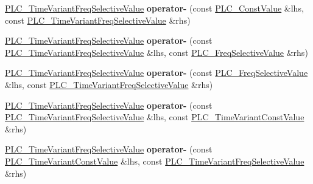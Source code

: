 \begin{DoxyCompactItemize}
\item 
\hypertarget{classns3_1_1PLC__TimeVariantFreqSelectiveValue_adf586392cef7de90730546a6350120cf}{\hyperlink{classns3_1_1PLC__TimeVariantFreqSelectiveValue}{\-P\-L\-C\-\_\-\-Time\-Variant\-Freq\-Selective\-Value} {\bfseries operator-\/} (const \hyperlink{classns3_1_1PLC__ConstValue}{\-P\-L\-C\-\_\-\-Const\-Value} \&lhs, const \hyperlink{classns3_1_1PLC__TimeVariantFreqSelectiveValue}{\-P\-L\-C\-\_\-\-Time\-Variant\-Freq\-Selective\-Value} \&rhs)}\label{classns3_1_1PLC__TimeVariantFreqSelectiveValue_adf586392cef7de90730546a6350120cf}

\item 
\hypertarget{classns3_1_1PLC__TimeVariantFreqSelectiveValue_a29c786d584a873331a8f7685f959a12f}{\hyperlink{classns3_1_1PLC__TimeVariantFreqSelectiveValue}{\-P\-L\-C\-\_\-\-Time\-Variant\-Freq\-Selective\-Value} {\bfseries operator-\/} (const \hyperlink{classns3_1_1PLC__TimeVariantFreqSelectiveValue}{\-P\-L\-C\-\_\-\-Time\-Variant\-Freq\-Selective\-Value} \&lhs, const \hyperlink{classns3_1_1PLC__FreqSelectiveValue}{\-P\-L\-C\-\_\-\-Freq\-Selective\-Value} \&rhs)}\label{classns3_1_1PLC__TimeVariantFreqSelectiveValue_a29c786d584a873331a8f7685f959a12f}

\item 
\hypertarget{classns3_1_1PLC__TimeVariantFreqSelectiveValue_a8413e331689c49e697e8ce8ba6bb1b66}{\hyperlink{classns3_1_1PLC__TimeVariantFreqSelectiveValue}{\-P\-L\-C\-\_\-\-Time\-Variant\-Freq\-Selective\-Value} {\bfseries operator-\/} (const \hyperlink{classns3_1_1PLC__FreqSelectiveValue}{\-P\-L\-C\-\_\-\-Freq\-Selective\-Value} \&lhs, const \hyperlink{classns3_1_1PLC__TimeVariantFreqSelectiveValue}{\-P\-L\-C\-\_\-\-Time\-Variant\-Freq\-Selective\-Value} \&rhs)}\label{classns3_1_1PLC__TimeVariantFreqSelectiveValue_a8413e331689c49e697e8ce8ba6bb1b66}

\item 
\hypertarget{classns3_1_1PLC__TimeVariantFreqSelectiveValue_a1ef0bfbaf48fc181eb32cfa80f338b5d}{\hyperlink{classns3_1_1PLC__TimeVariantFreqSelectiveValue}{\-P\-L\-C\-\_\-\-Time\-Variant\-Freq\-Selective\-Value} {\bfseries operator-\/} (const \hyperlink{classns3_1_1PLC__TimeVariantFreqSelectiveValue}{\-P\-L\-C\-\_\-\-Time\-Variant\-Freq\-Selective\-Value} \&lhs, const \hyperlink{classns3_1_1PLC__TimeVariantConstValue}{\-P\-L\-C\-\_\-\-Time\-Variant\-Const\-Value} \&rhs)}\label{classns3_1_1PLC__TimeVariantFreqSelectiveValue_a1ef0bfbaf48fc181eb32cfa80f338b5d}

\item 
\hypertarget{classns3_1_1PLC__TimeVariantFreqSelectiveValue_a25b88e7645b32a75dfb84f46368258d0}{\hyperlink{classns3_1_1PLC__TimeVariantFreqSelectiveValue}{\-P\-L\-C\-\_\-\-Time\-Variant\-Freq\-Selective\-Value} {\bfseries operator-\/} (const \hyperlink{classns3_1_1PLC__TimeVariantConstValue}{\-P\-L\-C\-\_\-\-Time\-Variant\-Const\-Value} \&lhs, const \hyperlink{classns3_1_1PLC__TimeVariantFreqSelectiveValue}{\-P\-L\-C\-\_\-\-Time\-Variant\-Freq\-Selective\-Value} \&rhs)}\label{classns3_1_1PLC__TimeVariantFreqSelectiveValue_a25b88e7645b32a75dfb84f46368258d0}


\end{DoxyCompactItemize}
